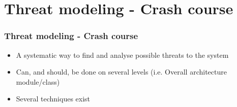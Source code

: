 \documentclass{beamer}
\begin{document}

  \section{Threat modeling - Crash course}
    \begin{frame}
      \frametitle{Threat modeling - Crash course}
      \begin{itemize}
        \item A systematic way to find and analyse possible threats to the system
        \item Can, and should, be done on several levels (i.e. Overall architecture \textrightarrow module/class)
        \item Several techniques exist
      \end{itemize}
    \end{frame}
\end{document}
